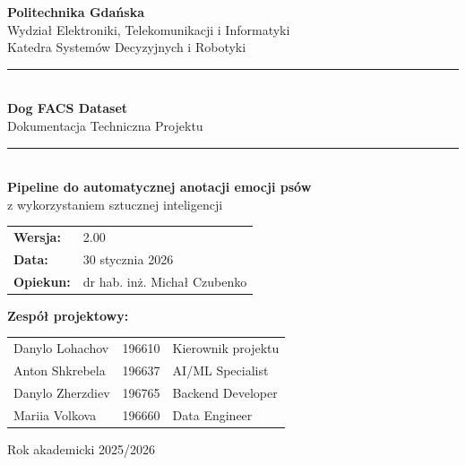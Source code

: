 \documentclass[12pt,a4paper]{article}
\begin{document}
\begin{titlepage}
    \centering
    \vspace*{2cm}

    {\Large\textbf{Politechnika Gdańska}}\\[0.3cm]
    {\large Wydział Elektroniki, Telekomunikacji i Informatyki}\\[0.3cm]
    {\large Katedra Systemów Decyzyjnych i Robotyki}\\[2cm]

    \rule{\textwidth}{1pt}\\[0.5cm]
    {\Huge\textbf{\textcolor{pgblue}{Dog FACS Dataset}}}\\[0.3cm]
    {\LARGE Dokumentacja Techniczna Projektu}\\[0.5cm]
    \rule{\textwidth}{1pt}\\[2cm]

    {\large\textbf{Pipeline do automatycznej anotacji emocji psów}}\\[0.5cm]
    {\large z wykorzystaniem sztucznej inteligencji}\\[3cm]

    \begin{tabular}{ll}
        \textbf{Wersja:} & 2.00 \\
        \textbf{Data:} & 30 stycznia 2026 \\
        \textbf{Opiekun:} & dr hab. inż. Michał Czubenko \\
    \end{tabular}

    \vfill

    \textbf{Zespół projektowy:}\\[0.3cm]
    \begin{tabular}{lll}
        Danylo Lohachov & 196610 & Kierownik projektu \\
        Anton Shkrebela & 196637 & AI/ML Specialist \\
        Danylo Zherzdiev & 196765 & Backend Developer \\
        Mariia Volkova & 196660 & Data Engineer \\
    \end{tabular}

    \vspace{1cm}
    {\small Rok akademicki 2025/2026}
\end{titlepage}

\tableofcontents
\newpage

\end{document}
